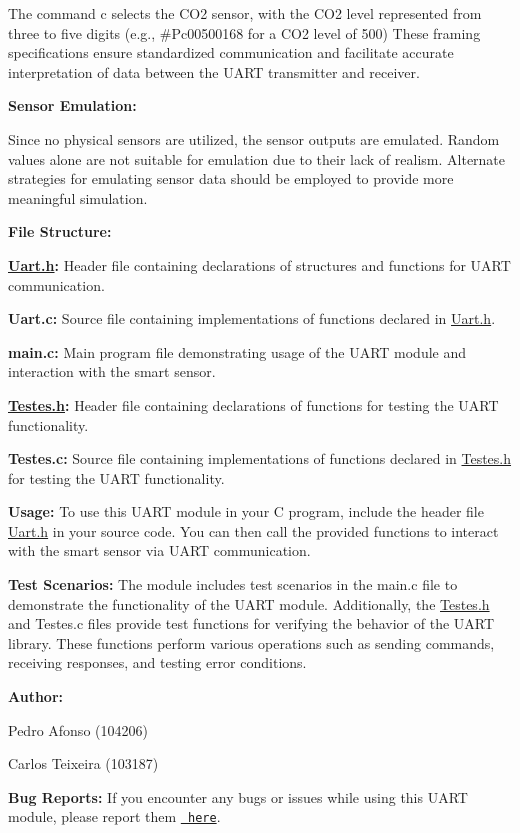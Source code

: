 \begin{DoxyItemize}
\begin{DoxyItemize}
\item The command \textquotesingle{}c\textquotesingle{} selects the CO2 sensor, with the CO2 level represented from three to five digits (e.\+g., \#\+Pc00500168 for a CO2 level of 500) These framing specifications ensure standardized communication and facilitate accurate interpretation of data between the UART transmitter and receiver.
\end{DoxyItemize}
\item {\bfseries{Sensor Emulation\+:}}
\begin{DoxyItemize}
\item Since no physical sensors are utilized, the sensor outputs are emulated. Random values alone are not suitable for emulation due to their lack of realism. Alternate strategies for emulating sensor data should be employed to provide more meaningful simulation.
\end{DoxyItemize}
\end{DoxyItemize}

{\bfseries{File Structure\+:}}
\begin{DoxyItemize}
\item {\bfseries{\mbox{\hyperlink{Uart_8h}{Uart.\+h}}\+:}} Header file containing declarations of structures and functions for UART communication.
\item {\bfseries{Uart.\+c\+:}} Source file containing implementations of functions declared in \mbox{\hyperlink{Uart_8h}{Uart.\+h}}.
\item {\bfseries{main.\+c\+:}} Main program file demonstrating usage of the UART module and interaction with the smart sensor.
\item {\bfseries{\mbox{\hyperlink{Testes_8h}{Testes.\+h}}\+:}} Header file containing declarations of functions for testing the UART functionality.
\item {\bfseries{Testes.\+c\+:}} Source file containing implementations of functions declared in \mbox{\hyperlink{Testes_8h}{Testes.\+h}} for testing the UART functionality.
\end{DoxyItemize}

{\bfseries{Usage\+:}} To use this UART module in your C program, include the header file \mbox{\hyperlink{Uart_8h}{Uart.\+h}} in your source code. You can then call the provided functions to interact with the smart sensor via UART communication.

{\bfseries{Test Scenarios\+:}} The module includes test scenarios in the main.\+c file to demonstrate the functionality of the UART module. Additionally, the \mbox{\hyperlink{Testes_8h}{Testes.\+h}} and Testes.\+c files provide test functions for verifying the behavior of the UART library. These functions perform various operations such as sending commands, receiving responses, and testing error conditions.

{\bfseries{Author\+:}}
\begin{DoxyItemize}
\item Pedro Afonso (104206)
\item Carlos Teixeira (103187)
\end{DoxyItemize}

{\bfseries{Bug Reports\+:}} If you encounter any bugs or issues while using this UART module, please report them \href{https://github.com/pisko19/SETR/issues}{\texttt{ here}}. 
